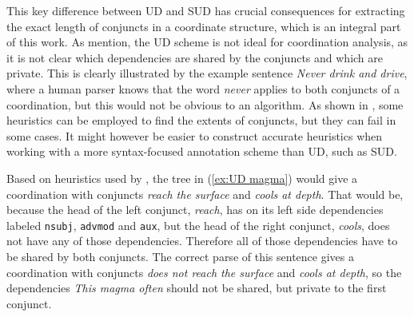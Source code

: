 \begin{exe}
    \ex
    \label{ex:distribution Mary}
    \begin{xlist}
    \end{xlist}
\end{exe}

This key difference between UD and SUD has crucial consequences for extracting the exact length of conjuncts in a coordinate structure, which is an integral part of this work. As \cite{prz:woz:23} mention, the UD scheme is not ideal for coordination analysis, as it is not clear which dependencies are shared by the conjuncts and which are private. This is clearly illustrated by the example sentence \textsl{Never drink and drive}, where a human parser knows that the word \textsl{never} applies to both conjuncts of a coordination, but this would not be obvious to an algorithm. As shown in \cite{pbg2023}, some heuristics can be employed to find the extents of conjuncts, but they can fail in some cases. It might however be easier to construct accurate heuristics when working with a more syntax-focused annotation scheme than UD, such as SUD. 

Based on heuristics used by \cite{pbg2023}, the tree in (\ref{ex:UD magma}) would give a coordination with conjuncts \textsl{reach the surface} and \textsl{cools at depth}. That would be, because the head of the left conjunct, \textsl{reach}, has on its left side dependencies labeled \texttt{nsubj}, \texttt{advmod} and \texttt{aux}, but the head of the right conjunct, \textsl{cools}, does not have any of those dependencies. Therefore all of those dependencies have to be shared by both conjuncts. The correct parse of this sentence gives a coordination with conjuncts \textsl{does not reach the surface} and \textsl{cools at depth}, so the dependencies \textsl{This magma often} should not be shared, but private to the first conjunct. 

